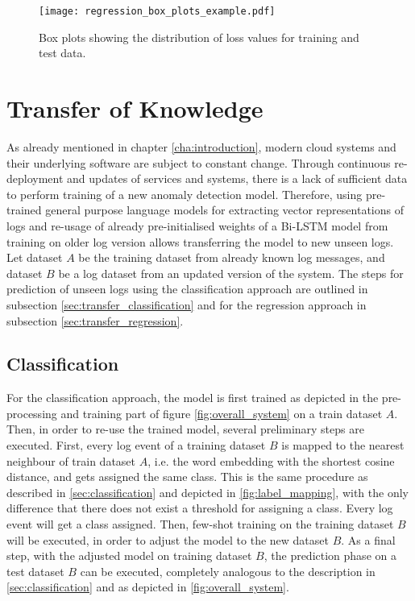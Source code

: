 \begin{figure}[h]
  \centering
  \texttt{[image: regression\_box\_plots\_example.pdf]} \\
  \caption{Box plots showing the distribution of loss values for training and test data.}
  \label{fig:regression_with_threshold}
\end{figure}

\newpage
\section{Transfer of Knowledge \label{sec:transferlearning}}
As already mentioned in chapter \ref{cha:introduction}, modern cloud systems and their underlying software are subject to constant change. Through continuous re-deployment and updates of services and systems, there is a lack of sufficient data to perform training of a new anomaly detection model. Therefore, using pre-trained general purpose language models for extracting vector representations of logs and re-usage of already pre-initialised weights of a Bi-LSTM model from training on older log version allows transferring the model to new unseen logs. Let dataset $A$ be the training dataset from already known log messages, and dataset $B$ be a log dataset from an updated version of the system. The steps for prediction of unseen logs using the classification approach are outlined in subsection \ref{sec:transfer_classification} and for the regression approach in subsection \ref{sec:transfer_regression}.

\begin{comment}
\begin{figure}[H]
	\centering
	\texttt{[image: transfer-learning.png]}
	\caption{Transfer of Knowledge System}
	\label{fig:transfer_learning_system}
\end{figure}
\end{comment}

\subsection{Classification \label{sec:transfer_classification}}
For the classification approach, the model is first trained as depicted in the pre-processing and training part of figure \ref{fig:overall_system} on a train dataset $A$. Then, in order to re-use the trained model, several preliminary steps are executed. First, every log event of a training dataset $B$ is mapped to the nearest neighbour of train dataset $A$, i.e. the word embedding with the shortest cosine distance, and gets assigned the same class. This is the same procedure as described in \ref{sec:classification} and depicted in \ref{fig:label_mapping}, with the only difference that there does not exist a threshold for assigning a class. Every log event will get a class assigned. Then, few-shot training on the training dataset $B$ will be executed, in order to adjust the model to the new dataset $B$. As a final step, with the adjusted model on training dataset $B$, the prediction phase on a test dataset $B$ can be executed, completely analogous to the description in \ref{sec:classification} and as depicted in \ref{fig:overall_system}.

